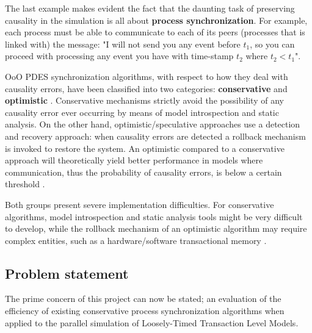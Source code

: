 \documentclass[12pt,twoside]{article}
\begin{document}
The last example makes evident the fact that the daunting task of preserving causality in the simulation is all about \textbf{process synchronization}.
For example, each process must be able to communicate to each of its peers (processes that is linked with) the message: 
"I will not send you any event before $t_1$, so you can proceed with processing any event you have with time-stamp $t_2$ where $t_2 < t_1$".

OoO PDES synchronization algorithms, with respect to how they deal with causality errors, have been classified into two categories: \textbf{conservative} and \textbf{optimistic} \cite{Fujimoto2015}.
Conservative mechanisms strictly avoid the possibility of any causality error ever occurring by means of model introspection and static analysis.
On the other hand, optimistic/speculative approaches use a detection and recovery approach: when causality errors are detected a rollback mechanism is invoked to restore the system.
An optimistic compared to a conservative approach will theoretically yield better performance in models where communication, thus the probability of causality errors, is below a certain threshold \cite{Fujimoto1990}.

Both groups present severe implementation difficulties.
For conservative algorithms, model introspection and static analysis tools might be very difficult to develop,
while the rollback mechanism of an optimistic algorithm may require complex entities, such as a hardware/software transactional memory \cite{Anane2015} .


\subsection{Problem statement}
\label{sec-4-6}
The prime concern of this project can now be stated;
an evaluation of the efficiency of existing conservative process synchronization algorithms when applied to the parallel simulation
of Loosely-Timed Transaction Level Models.
\end{document}
